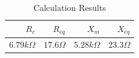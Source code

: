 \begin{table}[H]\centering
	\begin{threeparttable}
		\caption{Calculation Results}\label{tab:calc}
		\small
		\setlength{\tabcolsep}{5pt}
		\begin{tabular}{rrrr}
			\toprule
			$R_{c}$ & $R_{eq}$ & $X_{m}$ & $X_{eq}$ \\ \midrule
			$6.79k\Omega$ & $17.6\Omega$ & $5.28k\Omega$ &  23.3$\Omega$  \\ \bottomrule
		\end{tabular}
	\end{threeparttable}
\end{table}
